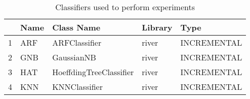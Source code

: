 \begin{table}
\footnotesize
\caption{Classifiers used to perform experiments}
\label{tab:algorithm}
\begin{tabular}{lllll}
\hline
 & Name & Class Name & Library & Type \\
\hline
1 & ARF & ARFClassifier & river & INCREMENTAL \\
2 & GNB & GaussianNB & river & INCREMENTAL \\
3 & HAT & HoeffdingTreeClassifier & river & INCREMENTAL \\
4 & KNN & KNNClassifier & river & INCREMENTAL \\
\hline
\end{tabular}
\end{table}
